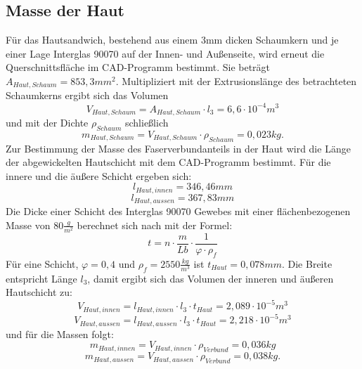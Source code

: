 \subsection{Masse der Haut}
Für das Hautsandwich, bestehend aus einem 3mm dicken Schaumkern und je einer Lage Interglas 90070 auf der Innen- und Außenseite, wird erneut die Querschnittsfläche im CAD-Programm bestimmt. Sie beträgt $ A_{Haut,Schaum}=853,3mm^{2} $. Multipliziert mit der Extrusionslänge des betrachteten Schaumkerns ergibt sich das Volumen 
\begin{equation}
	V_{Haut,Schaum}=A_{Haut,Schaum}\cdot l_{3}=6,6\cdot10^{-4}m^{3}
\end{equation}
und mit der Dichte $ \rho_{Schaum} $ schließlich
\begin{equation}
	m_{Haut,Schaum}=V_{Haut,Schaum}\cdot\rho_{Schaum}=0,023kg.
\end{equation}
Zur Bestimmung der Masse des Faserverbundanteils in der Haut wird die Länge der abgewickelten Hautschicht mit dem CAD-Programm bestimmt. Für die innere und die äußere Schicht ergeben sich:
\begin{equation}
	l_{Haut,innen}=346,46mm
\end{equation}
\begin{equation}
	l_{Haut,aussen}=367,83mm
\end{equation}
Die Dicke einer Schicht des Interglas 90070 Gewebes mit einer flächenbezogenen Masse von $ 80\frac{g}{m^{2}} $
berechnet sich nach \cite{item3} mit der Formel:
\begin{equation}
	t=n\cdot\frac{m}{Lb}\cdot\frac{1}{\varphi\cdot\rho_{f}}
\end{equation}
Für eine Schicht, $ \varphi=0,4 $ und $ \rho_{f}=2550\frac{kg}{m^{3}} $ ist $ t_{Haut}=0,078mm $.
Die Breite entspricht Länge $ l_{3} $, damit ergibt sich das Volumen der inneren und äußeren Hautschicht zu:
\begin{equation}
	V_{Haut,innen}=l_{Haut,innen}\cdot l_{3}\cdot t_{Haut}=2,089\cdot 10^{-5}m^{3}
\end{equation}
\begin{equation}
	V_{Haut,aussen}=l_{Haut,aussen}\cdot l_{3}\cdot t_{Haut}=2,218\cdot 10^{-5}m^{3}
\end{equation}
und für die Massen folgt:
\begin{equation}
	m_{Haut,innen}=V_{Haut,innen}\cdot \rho_{Verbund}=0,036kg
\end{equation}
\begin{equation}
	m_{Haut,aussen}=V_{Haut,aussen}\cdot \rho_{Verbund}=0,038kg.
\end{equation}

